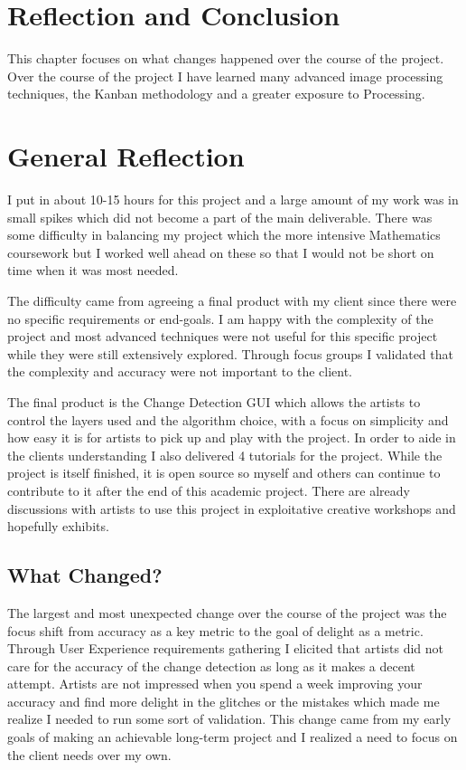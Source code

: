 \documentclass[a4paper]{report}
\begin{document}
\chapter{Reflection and Conclusion}
This chapter focuses on what changes happened over the course of the project. Over the course of the project I have learned many advanced image processing techniques, the Kanban methodology and a greater exposure to Processing. 

\chapter{General Reflection}
I put in about 10-15 hours for this project and a large amount of my work was in small spikes which did not become a part of the main deliverable. There was some difficulty in balancing my project which the more intensive Mathematics coursework but I worked well ahead on these so that I would not be short on time when it was most needed.

The difficulty came from agreeing a final product with my client since there were no specific requirements or end-goals. I am happy with the complexity of the project and most advanced techniques were not useful for this specific project while they were still extensively explored. Through focus groups I validated that the complexity and accuracy were not important to the client.

The final product is the Change Detection GUI which allows the artists to control the layers used and the algorithm choice, with a focus on simplicity and how easy it is for artists to pick up and play with the project. In order to aide in the clients understanding I also delivered 4 tutorials for the project. While the project is itself finished, it is open source so myself and others can continue to contribute to it after the end of this academic project. There are already discussions with artists to use this project in exploitative creative workshops and hopefully exhibits.

\section{What Changed?}
The largest and most unexpected change over the course of the project was the focus shift from accuracy as a key metric to the goal of delight as a metric. Through User Experience requirements gathering I elicited that artists did not care for the accuracy of the change detection as long as it makes a decent attempt. Artists are not impressed when you spend a week improving your accuracy and find more delight in the glitches or the mistakes which made me realize I needed to run some sort of validation. This change came from my early goals of making an achievable long-term project and I realized a need to focus on the client needs over my own.
\end{document}
